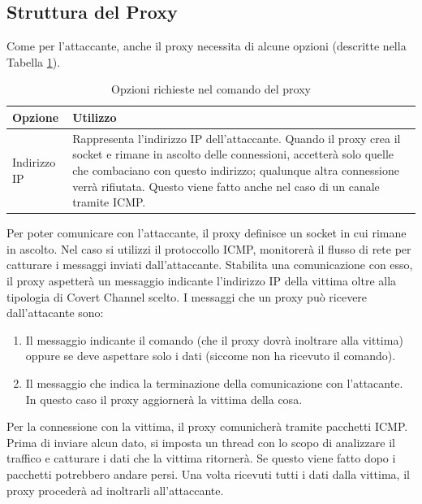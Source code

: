\subsection{Struttura del Proxy} 
Come per l'attaccante, anche il proxy necessita di alcune opzioni (descritte nella Tabella \ref{table:comunicazione:proxy:opzioni}). 
\newline
\begin{minipage}{\textwidth}
\begin{longtable}{|p{}|p{}|} 
\caption{Opzioni richieste nel comando del proxy} 
\label{table:comunicazione:proxy:opzioni} \\
    \hline 
    \textbf{Opzione} & \textbf{Utilizzo}  \\
    \hline
    Indirizzo IP & 
    Rappresenta l'indirizzo IP dell'attaccante. Quando il proxy crea il socket e rimane in ascolto delle connessioni, 
    accetterà solo quelle che combaciano con questo indirizzo; qualunque altra connessione verrà rifiutata. 
    Questo viene fatto anche nel caso di un canale tramite ICMP. 
    \\ 
    \hline 
\end{longtable} 
\end{minipage}
\vspace{2ex}  \newline 
Per poter comunicare con l'attaccante, il proxy definisce un socket in cui rimane in ascolto. 
Nel caso si utilizzi il protoccollo ICMP, monitorerà il flusso di rete per catturare i messaggi inviati dall'attaccante. 
Stabilita una comunicazione con esso, il proxy aspetterà un messaggio indicante l'indirizzo IP della 
vittima oltre alla tipologia di Covert Channel scelto. 
\vspace{1ex} \newline 
I messaggi che un proxy può ricevere dall'attacante sono: 
\begin{enumerate} 
    \item Il messaggio indicante il comando (che il proxy dovrà inoltrare 
    alla vittima) oppure se deve aspettare solo i dati 
    (siccome non ha ricevuto il comando). 
    \item Il messaggio che indica la terminazione della comunicazione con l'attacante. 
    In questo caso il proxy aggiornerà la vittima della cosa. 
\end{enumerate} 
Per la connessione con la vittima, il proxy comunicherà tramite pacchetti ICMP. 
Prima di inviare alcun dato, si imposta un thread con lo scopo di analizzare il traffico e catturare i dati che 
la vittima ritornerà.  
Se questo viene fatto dopo i pacchetti potrebbero andare persi.  
Una volta ricevuti tutti i dati dalla vittima, il proxy procederà ad inoltrarli all'attaccante.  

